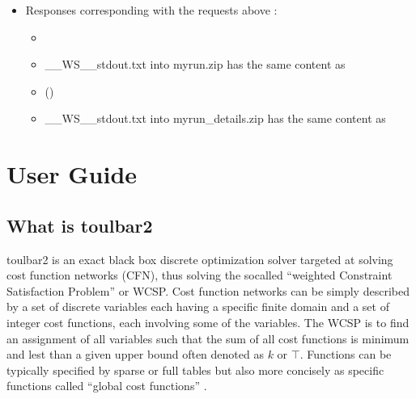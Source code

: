 \documentclass[letterpaper,10pt,openany,oneside,english]{sphinxmanual}
\begin{document}
\begin{itemize}
\item {} 
\sphinxAtStartPar
Responses corresponding with the requests above :
\begin{itemize}
\item {} 
\sphinxAtStartPar
{}

\item {} 
\sphinxAtStartPar
\_\_WS\_\_stdout.txt into myrun.zip has the same content as

\item {} 
\sphinxAtStartPar
{} ()

\item {} 
\sphinxAtStartPar
\_\_WS\_\_stdout.txt into myrun\_details.zip has the same content as

\end{itemize}

\end{itemize}

\sphinxstepscope


\chapter{User Guide}
\label{\detokenize{userdoc:user-guide}}\label{\detokenize{userdoc:userdoc}}\label{\detokenize{userdoc::doc}}

\section{What is toulbar2}
\label{\detokenize{userdoc:what-is-toulbar2}}
\sphinxAtStartPar
toulbar2 is an exact black box discrete optimization solver targeted
at solving cost function networks (CFN), thus solving the so\sphinxhyphen{}called
“weighted Constraint Satisfaction Problem” or WCSP. Cost function
networks can be simply described by a set of discrete variables each
having a specific finite domain and a set of integer cost functions,
each involving some of the variables. The WCSP is to find an
assignment of all variables such that the sum of all cost functions is
minimum and lest than a given upper bound often denoted as \(k\) or
\(\top\). Functions can be typically specified by sparse or full tables
but also more concisely as specific functions called “global cost
functions” .
\end{document}
